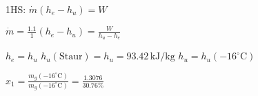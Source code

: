 1HS: \( \dot{m}(h_e - h_u) = W \)  

\( \dot{m} = \frac{1.1}{1}(h_e - h_u) = \frac{W}{h_u - h_e} \)  

\( h_e = h_u \)  
\( h_u(\text{Staur}) = h_u = 93.42 \, \text{kJ/kg} \)  
\( h_u = h_u(-16^\circ \text{C}) \)  

\( x_1 = \frac{m_g(-16^\circ \text{C})}{m_g(-16^\circ \text{C})} = \frac{1.3076}{30.76\%} \)
